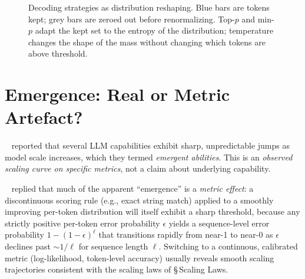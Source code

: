 \begin{figure}[H]
  \centering
  
  \caption{Decoding strategies as distribution reshaping. Blue
           bars are tokens kept; grey bars are zeroed out before
           renormalizing. Top-$p$ and min-$p$ adapt the kept set
           to the entropy of the distribution; temperature changes
           the shape of the mass without changing which tokens
           are above threshold.}
  \label{fig:decoding_strategies}
\end{figure}

\section{Emergence: Real or Metric Artefact?}

\Emp\ \citet{wei2022emergent} reported that several LLM capabilities
exhibit sharp, unpredictable jumps as model scale increases, which
they termed \emph{emergent abilities}. This is an \emph{observed
scaling curve on specific metrics}, not a claim about underlying
capability.

\Ident\ \citet{schaeffer2023mirage} replied that much of the
apparent ``emergence'' is a \emph{metric effect}: a discontinuous
scoring rule (e.g., exact string match) applied to a smoothly
improving per-token distribution will itself exhibit a sharp
threshold, because any strictly positive per-token error probability
$\epsilon$ yields a sequence-level error probability
$1 - (1-\epsilon)^{\ell}$ that transitions rapidly from near-1 to
near-0 as $\epsilon$ declines past $\sim 1/\ell$ for sequence length
$\ell$. Switching to a continuous, calibrated metric (log-likelihood,
token-level accuracy) usually reveals smooth scaling trajectories
consistent with the scaling laws of \S\,Scaling Laws.

